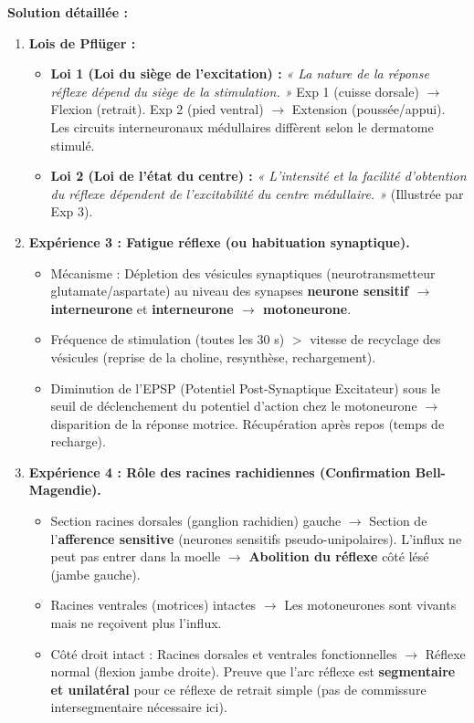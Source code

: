 \documentclass[11pt]{article}
\begin{document}
\begin{exoresolu}
\tcblower
\textbf{Solution détaillée :}
\begin{enumerate}
    \item \textbf{Lois de Pflüger :}
    \begin{itemize}
        \item \textbf{Loi 1 (Loi du siège de l'excitation) :} \textit{« La nature de la réponse réflexe dépend du siège de la stimulation. »} Exp 1 (cuisse dorsale) $\rightarrow$ Flexion (retrait). Exp 2 (pied ventral) $\rightarrow$ Extension (poussée/appui). Les circuits interneuronaux médullaires diffèrent selon le dermatome stimulé.
        \item \textbf{Loi 2 (Loi de l'état du centre) :} \textit{« L'intensité et la facilité d'obtention du réflexe dépendent de l'excitabilité du centre médullaire. »} (Illustrée par Exp 3).
    \end{itemize}
    \item \textbf{Expérience 3 : Fatigue réflexe (ou habituation synaptique).}
    \begin{itemize}
        \item Mécanisme : Dépletion des vésicules synaptiques (neurotransmetteur glutamate/aspartate) au niveau des synapses \textbf{neurone sensitif $\rightarrow$ interneurone} et \textbf{interneurone $\rightarrow$ motoneurone}.
        \item Fréquence de stimulation (toutes les 30 s) $>$ vitesse de recyclage des vésicules (reprise de la choline, resynthèse, rechargement).
        \item Diminution de l'EPSP (Potentiel Post-Synaptique Excitateur) sous le seuil de déclenchement du potentiel d'action chez le motoneurone $\rightarrow$ disparition de la réponse motrice. Récupération après repos (temps de recharge).
    \end{itemize}
    \item \textbf{Expérience 4 : Rôle des racines rachidiennes (Confirmation Bell-Magendie).}
    \begin{itemize}
        \item Section racines dorsales (ganglion rachidien) gauche $\rightarrow$ Section de l'\textbf{afference sensitive} (neurones sensitifs pseudo-unipolaires). L'influx ne peut pas entrer dans la moelle $\rightarrow$ \textbf{Abolition du réflexe} côté lésé (jambe gauche).
        \item Racines ventrales (motrices) intactes $\rightarrow$ Les motoneurones sont vivants mais ne reçoivent plus l'influx.
        \item Côté droit intact : Racines dorsales et ventrales fonctionnelles $\rightarrow$ Réflexe normal (flexion jambe droite). Preuve que l'arc réflexe est \textbf{segmentaire et unilatéral} pour ce réflexe de retrait simple (pas de commissure intersegmentaire nécessaire ici).

\end{itemize}
\end{enumerate}
\end{exoresolu}
\end{document}
